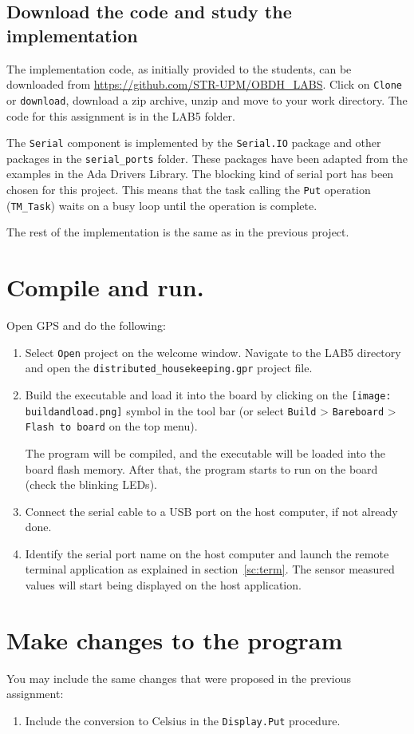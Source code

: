 \subsection{Download the code and study the implementation}

The implementation code, as initially provided to the students, can be downloaded from \url{https://github.com/STR-UPM/OBDH_LABS}. Click on {\tt Clone} or {\tt download}, download a zip archive, unzip and move to your work directory. The code for this assignment is in the LAB5 folder.

The {\tt Serial} component is implemented by the {\tt Serial.IO} package and other packages in the {\tt serial\_ports} folder. These packages have been adapted from the examples in the Ada Drivers Library. The blocking kind of serial port has been chosen for this project. This means that the task calling the {\tt Put} operation ({\tt TM\_Task}) waits on a busy loop until the operation is complete.

The rest of the implementation is the same as in the previous project.

\section{Compile and run.}

Open GPS and do the following:
\begin{enumerate}
\item Select {\tt Open} project on the welcome window. Navigate to the LAB5 directory and open the {\tt distributed\_housekeeping.gpr} project file.
\item Build the executable and load it into the board by clicking on the \hbox{\texttt{[image: buildandload.png]}} symbol in the tool bar (or select {\tt Build} > {\tt Bareboard} > {\tt Flash to board} on the top menu).

The program will be compiled, and the executable will be loaded into the board flash memory. After that, the program starts to run on the board (check the blinking LEDs).
\item Connect the serial cable to a USB port on the host computer, if not already done.
\item Identify the serial port name on the host computer and launch the remote terminal application as explained in section~\ref{sc:term}. The sensor measured values will start being displayed on the host application.
\end{enumerate}


\section{Make changes to the program}

You may include the same changes that were proposed in the previous assignment:

\begin{enumerate}
\item Include the conversion to Celsius in the {\tt Display.Put} procedure.
\end{enumerate}
